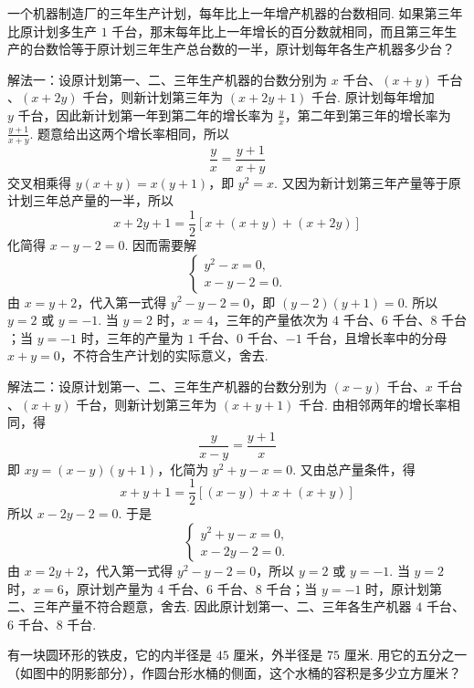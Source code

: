 \begin{problem}
一个机器制造厂的三年生产计划，每年比上一年增产机器的台数相同. 如果第三年比原计划多生产 \(1\text{ 千台}\)，那末每年比上一年增长的百分数就相同，而且第三年生产的台数恰等于原计划三年生产总台数的一半，原计划每年各生产机器多少台？
\end{problem}

\begin{solution}
解法一：设原计划第一、二、三年生产机器的台数分别为 \(x\text{ 千台}\)、\((x+y)\text{ 千台}\)、\((x+2y)\text{ 千台}\)，则新计划第三年为 \((x+2y+1)\text{ 千台}\). 原计划每年增加 \(y\text{ 千台}\)，因此新计划第一年到第二年的增长率为 \(\frac{y}{x}\)，第二年到第三年的增长率为 \(\frac{y+1}{x+y}\). 题意给出这两个增长率相同，所以
\[
\frac{y}{x}=\frac{y+1}{x+y}
\]
交叉相乘得 \(y(x+y)=x(y+1)\)，即 \(y^2=x\). 又因为新计划第三年产量等于原计划三年总产量的一半，所以
\[
x+2y+1=\frac{1}{2}\left[x+(x+y)+(x+2y)\right]
\]
化简得 \(x-y-2=0\). 因而需要解
\[
\begin{cases}
y^2-x=0,\\
x-y-2=0.
\end{cases}
\]
由 \(x=y+2\)，代入第一式得 \(y^2-y-2=0\)，即 \((y-2)(y+1)=0\). 所以 \(y=2\) 或 \(y=-1\). 当 \(y=2\) 时，\(x=4\)，三年的产量依次为 \(4\text{ 千台}\)、\(6\text{ 千台}\)、\(8\text{ 千台}\)；当 \(y=-1\) 时，三年的产量为 \(1\text{ 千台}\)、\(0\text{ 千台}\)、\(-1\text{ 千台}\)，且增长率中的分母 \(x+y=0\)，不符合生产计划的实际意义，舍去.

解法二：设原计划第一、二、三年生产机器的台数分别为 \((x-y)\text{ 千台}\)、\(x\text{ 千台}\)、\((x+y)\text{ 千台}\)，则新计划第三年为 \((x+y+1)\text{ 千台}\). 由相邻两年的增长率相同，得
\[
\frac{y}{x-y}=\frac{y+1}{x}
\]
即 \(xy=(x-y)(y+1)\)，化简为 \(y^2+y-x=0\). 又由总产量条件，得
\[
x+y+1=\frac{1}{2}\left[(x-y)+x+(x+y)\right]
\]
所以 \(x-2y-2=0\). 于是
\[
\begin{cases}
y^2+y-x=0,\\
x-2y-2=0.
\end{cases}
\]
由 \(x=2y+2\)，代入第一式得 \(y^2-y-2=0\)，所以 \(y=2\) 或 \(y=-1\). 当 \(y=2\) 时，\(x=6\)，原计划产量为 \(4\text{ 千台}\)、\(6\text{ 千台}\)、\(8\text{ 千台}\)；当 \(y=-1\) 时，原计划第二、三年产量不符合题意，舍去. 因此原计划第一、二、三年各生产机器 \(4\text{ 千台}\)、\(6\text{ 千台}\)、\(8\text{ 千台}\).
\end{solution}

\begin{problem}
有一块圆环形的铁皮，它的内半径是 \(45\text{ 厘米}\)，外半径是 \(75\text{ 厘米}\). 用它的五分之一（如图中的阴影部分），作圆台形水桶的侧面，这个水桶的容积是多少立方厘米？

\end{problem}

